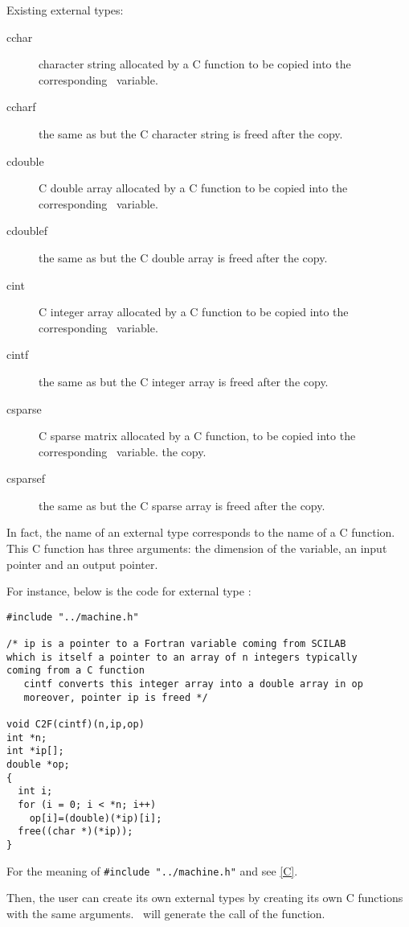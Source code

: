 \documentclass[11pt]{article}
\begin{document}
\smallskip

Existing external types:
\begin{description}
 \item[cchar] character string allocated by a C function to be copied into the
corresponding \SCI\ variable.
 \item[ccharf] the same as  but the C character string is freed after
the copy.
 \item[cdouble] C double array allocated by a C function to be copied into the
corresponding \SCI\ variable.
 \item[cdoublef] the same as  but the C double array is freed after
the copy.
 \item[cint] C integer array allocated by a C function to be copied into the
corresponding \SCI\ variable.
 \item[cintf] the same as  but the C integer array is freed after
the copy.
 \item[csparse] C sparse matrix allocated by a C function, to be
copied into the corresponding \SCI\ variable.
the copy.
 \item[csparsef] the same as  but the C sparse array is freed after
the copy.
\end{description}

\medskip

In fact, the name of an external type corresponds to the name of a C function.
This C function has three arguments: the dimension of the variable, an input
pointer and an output pointer.

For instance, below is the code for external type :
\begin{verbatim}
#include "../machine.h"   

/* ip is a pointer to a Fortran variable coming from SCILAB
which is itself a pointer to an array of n integers typically
coming from a C function
   cintf converts this integer array into a double array in op 
   moreover, pointer ip is freed */

void C2F(cintf)(n,ip,op)
int *n;
int *ip[];
double *op;
{
  int i;
  for (i = 0; i < *n; i++)
    op[i]=(double)(*ip)[i];
  free((char *)(*ip));
}
\end{verbatim}

For the meaning of \verb|#include "../machine.h"| and  see \ref{C}.

\smallskip

Then, the user can create its own external types by creating its own C
functions with the same arguments. \ISCI\ will generate the call of the
function. 
\end{document}

